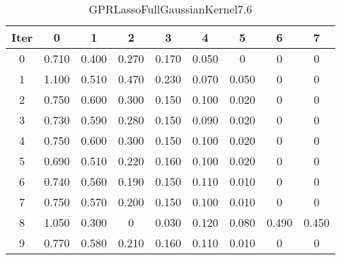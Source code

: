 \begin{table}
	\begin{center}
		\begin{tabular}{|c|c|c|c|c|c|c|c|c|}
			\hline
			Iter & 0 & 1 & 2 & 3 & 4 & 5 & 6 & 7 \\
			\hline
			0 & 0.710 & 0.400 & 0.270 & 0.170 & 0.050 & 0 & 0 & 0 \\
			\hline
			1 & 1.100 & 0.510 & 0.470 & 0.230 & 0.070 & 0.050 & 0 & 0 \\
			\hline
			2 & 0.750 & 0.600 & 0.300 & 0.150 & 0.100 & 0.020 & 0 & 0 \\
			\hline
			3 & 0.730 & 0.590 & 0.280 & 0.150 & 0.090 & 0.020 & 0 & 0 \\
			\hline
			4 & 0.750 & 0.600 & 0.300 & 0.150 & 0.100 & 0.020 & 0 & 0 \\
			\hline
			5 & 0.690 & 0.510 & 0.220 & 0.160 & 0.100 & 0.020 & 0 & 0 \\
			\hline
			6 & 0.740 & 0.560 & 0.190 & 0.150 & 0.110 & 0.010 & 0 & 0 \\
			\hline
			7 & 0.750 & 0.570 & 0.200 & 0.150 & 0.100 & 0.010 & 0 & 0 \\
			\hline
			8 & 1.050 & 0.300 & 0 & 0.030 & 0.120 & 0.080 & 0.490 & 0.450 \\
			\hline
			9 & 0.770 & 0.580 & 0.210 & 0.160 & 0.110 & 0.010 & 0 & 0 \\
			\hline
		\end{tabular}
	\end{center}
	\caption{GPRLassoFullGaussianKernel7.6}
\end{table}